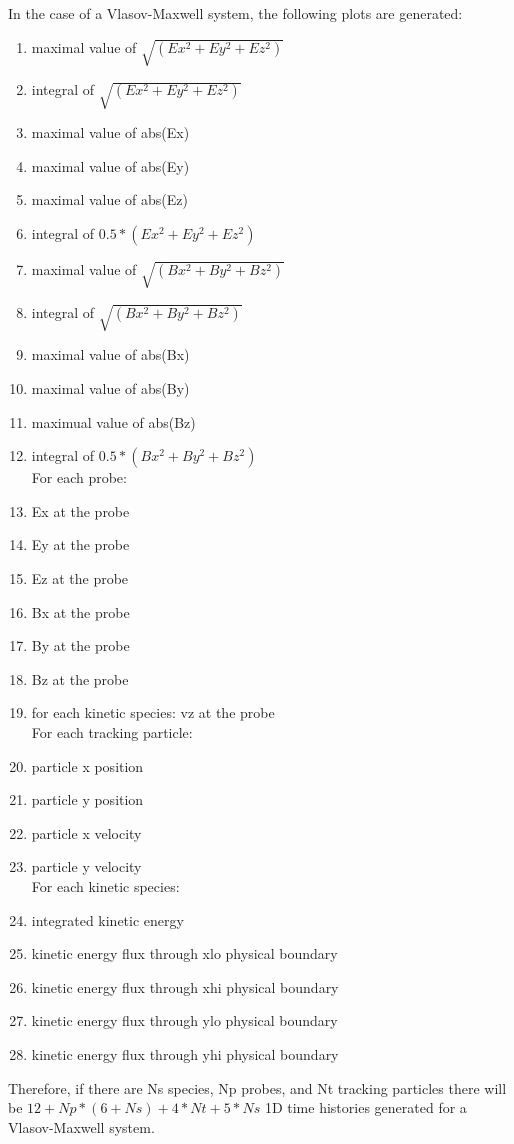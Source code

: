 \documentclass[11pt]{amsart}
\begin{document}
In the case of a Vlasov-Maxwell system, the following plots are generated:
\begin{enumerate}
\item maximal value of $\sqrt{(Ex^2 + Ey^2 + Ez^2)}$
\item integral of $\sqrt{(Ex^2 + Ey^2 + Ez^2)}$
\item maximal value of abs(Ex)
\item maximal value of abs(Ey)
\item maximal value of abs(Ez)
\item integral of $0.5*(Ex^2 + Ey^2 + Ez^2) $
\item maximal value of $\sqrt{(Bx^2 + By^2 + Bz^2)} $
\item integral of $\sqrt{(Bx^2 + By^2 + Bz^2) } $
\item maximal value of abs(Bx)
\item maximal value of abs(By)
\item maximual value of abs(Bz)
\item integral of $0.5*(Bx^2 + By^2 + Bz^2) $  \\
For each probe:
\item Ex at the probe
\item Ey at the probe
\item Ez at the probe
\item Bx at the probe
\item By at the probe
\item Bz at the probe
\item for each kinetic species: vz at the probe \\
For each tracking particle:
\item particle x position
\item particle y position
\item particle x velocity
\item particle y velocity \\
For each kinetic species:
\item integrated kinetic energy
\item kinetic energy flux through xlo physical boundary
\item kinetic energy flux through xhi physical boundary
\item kinetic energy flux through ylo physical boundary
\item kinetic energy flux through yhi physical boundary
\end{enumerate}
Therefore, if there are Ns species, Np probes, and Nt tracking particles there
will be $12+Np*(6+Ns)+4*Nt+5*Ns$ 1D time histories generated for a
Vlasov-Maxwell system.
\end{document}

